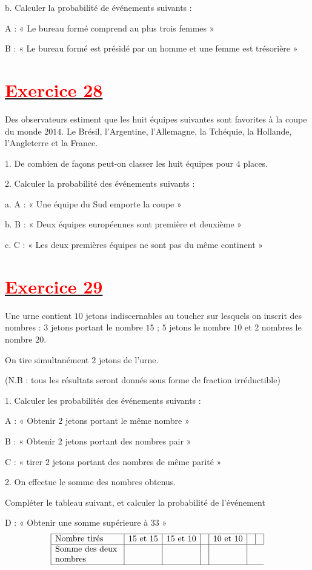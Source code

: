 \documentclass[12pt]{article}
\begin{document}
b. Calculer la probabilité de événements suivants :

A : « Le bureau formé comprend au plus trois femmes »

B : « Le bureau formé est présidé par un homme et une femme est trésorière »
\section*{\underline{\textbf{\textcolor{red}{Exercice 28}}}}
Des observateurs estiment que les huit équipes suivantes sont favorites à la coupe du monde $2014.$ Le Brésil, l’Argentine, l'Allemagne, la Tchéquie, la Hollande, l'Angleterre et la France.

1. De combien de façons peut-on classer les huit équipes pour $4$ places.
	
2. Calculer la probabilité des événements suivants :

a. A : « Une équipe du Sud emporte la coupe »

b. B : « Deux équipes européennes sont première et deuxième »

c. C : « Les deux premières équipes ne sont pas du même continent »
\section*{\underline{\textbf{\textcolor{red}{Exercice 29}}}}
Une urne contient $10$ jetons indiscernables au toucher sur lesquels on inscrit des nombres : $3$ jetons portant le nombre $15$ ; $5$ jetons le nombre $10$ et $2$ nombres le nombre $20.$

On tire simultanément $2$ jetons de l'urne.

(N.B : tous les résultats seront donnés sous forme de fraction irréductible)

1. Calculer les probabilités des événements suivants :

A : « Obtenir $2$ jetons portant le même nombre »

B : « Obtenir $2$ jetons portant des nombres pair »

C : « tirer $2$ jetons portant des nombres de même parité »

2. On effectue le somme des nombres obtenus.

Compléter le tableau suivant, et calculer la probabilité de l'événement

D : « Obtenir une somme supérieure à $33$ »
	$$\begin{array}{|l|c|c|c|c|c|c|} \hline \text{Nombre tirés }&15\text{ et }15&15\text{ et }10&&10\text{ et }10&&\\ \hline \text{Somme des deux }&&&&\\ \text{nombres }&&&&\\ \hline \end{array}$$
\end{document}
